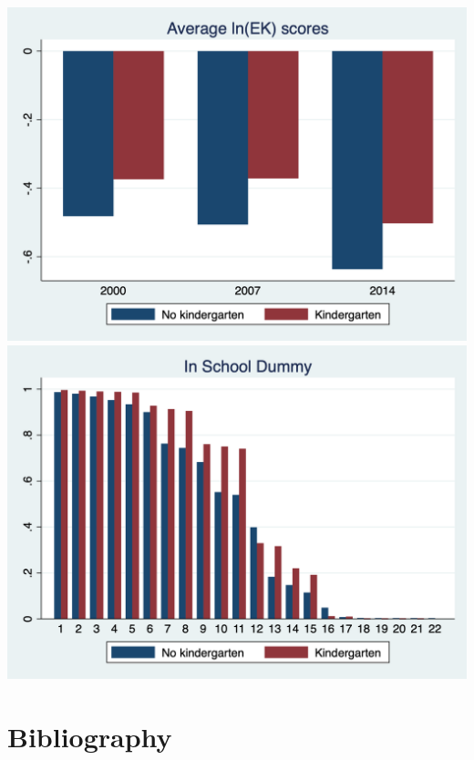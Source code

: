 \documentclass[6pt]{article}
\begin{document}
\includegraphics[width=\textwidth]{ek_sample.png}
\includegraphics[width=\textwidth]{in_school.png}

\section{Bibliography}


\end{document}
